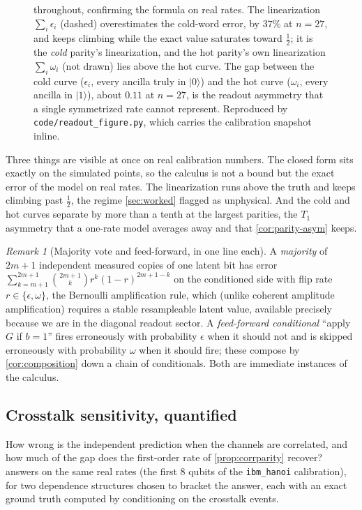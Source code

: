 \documentclass[a4paper,onecolumn,unpublished,nopdfoutputerror,allowtoday]{quantumarticle}
\numberwithin{equation}{section}
\theoremstyle{plain}
\theoremstyle{definition}
\theoremstyle{remark}
\newtheorem{remark}[theorem]{Remark}
\newcommand{\eps}{\epsilon}
\newcommand{\ket}[1]{\lvert #1 \rangle}
\begin{document}
\begin{figure}[t]
{throughout, confirming the formula on real rates. The linearization
$\sum_i \eps_i$ (dashed) overestimates the cold-word error, by $37\%$ at $n=27$,
and keeps climbing while the exact value saturates toward $\tfrac12$; it is the
\emph{cold} parity's linearization, and the hot parity's own linearization
$\sum_i \omega_i$ (not drawn) lies above the hot curve. The gap
between the cold curve ($\eps_i$, every ancilla truly in $\ket{0}$) and the hot
curve ($\omega_i$, every ancilla in $\ket{1}$), about $0.11$ at $n=27$, is the
readout asymmetry that a single symmetrized rate cannot represent. Reproduced by
\texttt{code/readout\_figure.py}, which carries the calibration snapshot inline.}
\label{fig:realcalib}
\end{figure}

Three things are visible at once on real calibration numbers. The closed form sits exactly
on the simulated points, so the calculus is not a bound but the exact error of the
model on real rates. The linearization runs above the truth and keeps climbing
past $\tfrac12$, the regime \cref{sec:worked} flagged as unphysical. And the cold
and hot curves separate by more than a tenth at the largest parities, the $T_1$
asymmetry that a one-rate model averages away and that \cref{cor:parity-asym}
keeps.

\begin{remark}[Majority vote and feed-forward, in one line each]
A \emph{majority} of $2m+1$ independent measured copies of one latent bit has
error $\sum_{k=m+1}^{2m+1}\binom{2m+1}{k} r^k (1-r)^{2m+1-k}$ on the conditioned
side with flip rate $r\in\{\eps,\omega\}$, the Bernoulli amplification rule,
which (unlike coherent amplitude amplification) requires a stable resampleable
latent value, available precisely because we are in the diagonal readout sector.
A \emph{feed-forward conditional} ``apply $G$ if $b=1$'' fires erroneously with
probability $\eps$ when it should not and is skipped erroneously with probability
$\omega$ when it should fire; these compose by \cref{cor:composition} down a
chain of conditionals. Both are immediate instances of the calculus.
\end{remark}

\subsection{Crosstalk sensitivity, quantified}
\label{sec:worked-crosstalk}

How wrong is the independent prediction when the channels are correlated, and
how much of the gap does the first-order rate of \cref{prop:corrparity}
recover?  answers on the same real rates (the first $8$
qubits of the \texttt{ibm\_hanoi} calibration), for two dependence structures
chosen to bracket the answer, each with an exact ground truth computed by
conditioning on the crosstalk events.
\end{document}
